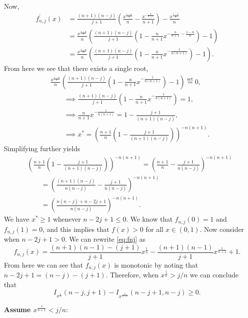\documentclass[12pt]{article}
\newcommand{\xn}{x^{\frac{1}{n}}}
\newcommand{\xnone}{x^{\frac{1}{n+1}}}
\begin{document}
Now,
\begin{align*}
	f_{n,j}^{\prime}(x) &= \frac{(n+1)(n-j)}{j+1}\left(\frac{x^{\frac{1-n}{n}}}{n} - \frac{x^{-\frac{n}{n+1}}}{n+1}\right) - \frac{x^{\frac{1-n}{n}}}{n} \\
	&=\frac{x^{\frac{1-n}{n}}}{n}\left(\frac{(n+1)(n-j)}{j+1}\left(1 - \frac{n}{n+1}x^{-\frac{n}{n+1} -\frac{1-n}{n}}\right) - 1\right) \\
	&=\frac{x^{\frac{1-n}{n}}}{n}\left(\frac{(n+1)(n-j)}{j+1}\left(1 - \frac{n}{n+1}x^{-\frac{1}{n(n+1)}}\right) - 1\right).
\end{align*}
From here we see that there exists a single root,
\begin{align*}
	&\frac{x^{\frac{1-n}{n}}}{n}\left(\frac{(n+1)(n-j)}{j+1}\left(1 - \frac{n}{n+1}x^{-\frac{1}{n(n+1)}}\right) - 1\right) \overset{\text{set}}{=} 0, \\
	&\qquad\implies \frac{(n+1)(n-j)}{j+1}\left(1 - \frac{n}{n+1}x^{-\frac{1}{n(n+1)}}\right) = 1, \\
	&\qquad\implies \frac{n}{n+1}x^{-\frac{1}{n(n+1)}} = 1 - \frac{j+1}{(n+1)(n-j)}, \\
	&\qquad\implies x^* = \left(\frac{n+1}{n}\left(1 - \frac{j+1}{(n+1)(n-j)}\right)\right)^{-n(n+1)}.
\end{align*}
Simplifying further yields
\begin{align*}
	&\left(\frac{n+1}{n}\left(1 - \frac{j+1}{(n+1)(n-j)}\right)\right)^{-n(n+1)} 
	 = \left(\frac{n+1}{n} - \frac{j+1}{n(n-j)}\right)^{-n(n+1)} \\
	 &\qquad= \left(\frac{(n+1)(n-j)}{n(n-j)} - \frac{j+1}{n(n-j)}\right)^{-n(n+1)} \\
	 &\qquad= \left(\frac{n(n-j) + n - 2j+1}{n(n-j)} \right)^{-n(n+1)}.
\end{align*}
We have $x^* \geq 1$ whenever $n - 2j + 1 \leq 0$. We know that $f_{n,j}(0) = 1$ and $f_{n,j}(1) = 0$, and this implies that $f(x) > 0$ for all $x \in (0,1)$. Now consider when $n - 2j + 1 > 0$. We can rewrite \eqref{eq:fnj} as
$$
  f_{n,j}(x) = \frac{(n+1)(n-1) - (j+1)}{j+1}\xn - \frac{(n+1)(n-1)}{j+1}\xnone + 1.
$$
From here we can see that $f_{n,j}(x)$ is monotonic by noting that $n - 2j + 1 = (n-j)- (j+1)$. Therefore, when $\xn > j/n$ we can conclude that
$$
  I_{\xn}(n-j, j+1) - I_{\xnone}(n-j+1, n-j) \geq 0.
$$
 

\vspace{12pt}

\noindent\textbf{Assume $\xnone < j/n$}:
\end{document}
